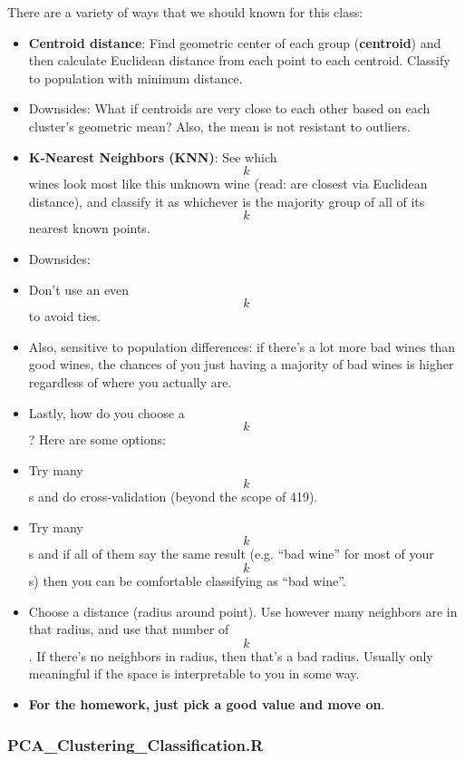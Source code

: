 There are a variety of ways that we should known for this class:

\begin{itemize}
\tightlist
\item
  \textbf{Centroid distance}: Find geometric center of each group
  (\textbf{centroid}) and then calculate Euclidean distance from each
  point to each centroid. Classify to population with minimum distance.
\item
  Downsides: What if centroids are very close to each other based on
  each cluster's geometric mean? Also, the mean is not resistant to
  outliers.
\item
  \textbf{K-Nearest Neighbors (KNN)}: See which \[k\] wines look most
  like this unknown wine (read: are closest via Euclidean distance), and
  classify it as whichever is the majority group of all of its \[k\]
  nearest known points.
\item
  Downsides:
\item
  Don't use an even \[k\] to avoid ties.
\item
  Also, sensitive to population differences: if there's a lot more bad
  wines than good wines, the chances of you just having a majority of
  bad wines is higher regardless of where you actually are.
\item
  Lastly, how do you choose a \[k\]? Here are some options:
\item
  Try many \[k\]s and do cross-validation (beyond the scope of 419).
\item
  Try many \[k\]s and if all of them say the same result (e.g. ``bad
  wine'' for most of your \[k\]s) then you can be comfortable
  classifying as ``bad wine''.
\item
  Choose a distance (radius around point). Use however many neighbors
  are in that radius, and use that number of \[k\]. If there's no
  neighbors in radius, then that's a bad radius. Usually only meaningful
  if the space is interpretable to you in some way.
\item
  \textbf{For the homework, just pick a good value and move on}.
\end{itemize}

\hypertarget{pca_clustering_classification.r}{%
\subsubsection{PCA\_Clustering\_Classification.R}\label{pca_clustering_classification.r}}

